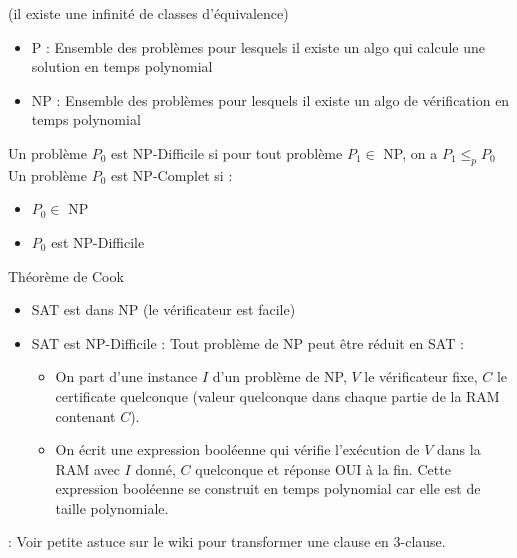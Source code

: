  (il existe une infinité de classes d'équivalence)
\begin{itemize}
	\item P : Ensemble des problèmes pour lesquels il existe un algo qui calcule une solution en temps polynomial
	\item NP : Ensemble des problèmes pour lesquels il existe un algo de vérification en temps polynomial
\end{itemize}

 Un problème $P_0$ est NP-Difficile si pour tout problème $P_1 \in $ NP, on a $P_1 \leq_p P_0$ \\

 Un problème $P_0$ est NP-Complet si : 
\begin{itemize}
	\item $P_0 \in $ NP
	\item $P_0$ est NP-Difficile
\end{itemize}

 Théorème de Cook
\begin{itemize}
	\item SAT est dans NP (le vérificateur est facile)
	\item SAT est NP-Difficile : Tout problème de NP peut être réduit en SAT :
	\begin{itemize}
		\item On part d'une instance $I$ d'un problème de NP, $V$ le vérificateur fixe, $C$ le certificate quelconque (valeur quelconque dans chaque partie de la RAM contenant $C$).
		\item On écrit une expression booléenne qui vérifie l'exécution de $V$ dans la RAM avec $I$ donné, $C$ quelconque et réponse OUI à la fin. Cette expression booléenne se construit en temps polynomial car elle est de taille polynomiale.
	\end{itemize}
\end{itemize}

 : Voir petite astuce sur le wiki pour transformer une clause en 3-clause.
